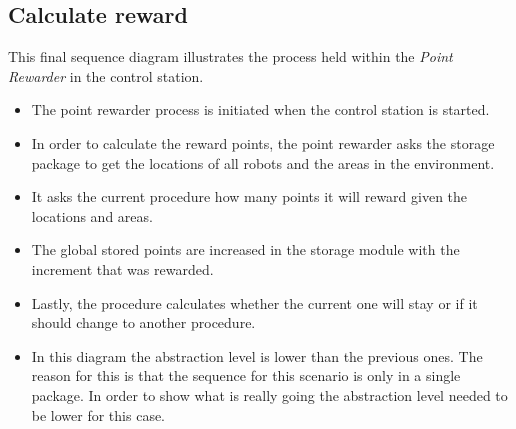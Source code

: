 \subsection{Calculate reward}
This final sequence diagram illustrates the process held within the \textit{Point Rewarder} in the control station.
\begin{itemize}
    \item The point rewarder process is initiated when the control station is started.
    \item In order to calculate the reward points, the point rewarder asks the storage package to get the locations of all robots and the areas in the environment.
    \item It asks the current procedure how many points it will reward given the locations and areas.
    \item The global stored points are increased in the storage module with the increment that was rewarded.
    \item Lastly, the procedure calculates whether the current one will stay or if it should change to another procedure.
    \item In this diagram the abstraction level is lower than the previous ones. The reason for this is that the sequence for this scenario is only in a single package. In order to show what is really going the abstraction level needed to be lower for this case.
\end{itemize}